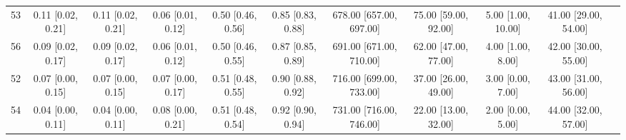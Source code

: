 \documentclass[8pt]{article}
\begin{document}
\begin{center}
\begin{footnotesize}
\begin{longtable}{|ccccccccccc|}
 53 &  0.11 [0.02, 0.21] &  0.11 [0.02, 0.21] &  0.06 [0.01, 0.12] &  0.50 [0.46, 0.56] &  0.85 [0.83, 0.88] &  678.00 [657.00, 697.00] &     75.00 [59.00, 92.00] &    5.00 [1.00, 10.00] &  41.00 [29.00, 54.00] \\
 56 &  0.09 [0.02, 0.17] &  0.09 [0.02, 0.17] &  0.06 [0.01, 0.12] &  0.50 [0.46, 0.55] &  0.87 [0.85, 0.89] &  691.00 [671.00, 710.00] &     62.00 [47.00, 77.00] &     4.00 [1.00, 8.00] &  42.00 [30.00, 55.00] \\
 52 &  0.07 [0.00, 0.15] &  0.07 [0.00, 0.15] &  0.07 [0.00, 0.17] &  0.51 [0.48, 0.55] &  0.90 [0.88, 0.92] &  716.00 [699.00, 733.00] &     37.00 [26.00, 49.00] &     3.00 [0.00, 7.00] &  43.00 [31.00, 56.00] \\
 54 &  0.04 [0.00, 0.11] &  0.04 [0.00, 0.11] &  0.08 [0.00, 0.21] &  0.51 [0.48, 0.54] &  0.92 [0.90, 0.94] &  731.00 [716.00, 746.00] &     22.00 [13.00, 32.00] &     2.00 [0.00, 5.00] &  44.00 [32.00, 57.00] \\
\end{longtable}
\end{footnotesize}
\end{center}
\end{document}
